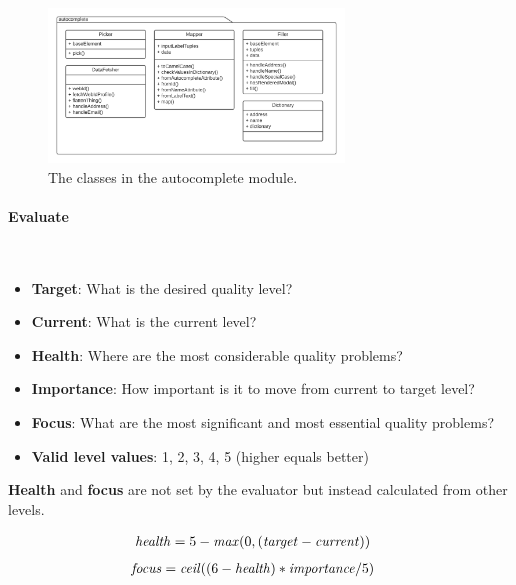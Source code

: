 \begin{figure}[H]
    \centering
    \includegraphics[width=0.7\textwidth]{prototype/graphs/poc-autocomplete-package.png}
    \caption{The classes in the autocomplete module.}
    \label{fig:poc-autocomplete-package}
\end{figure}
\vspace{0.5cm}
\paragraph{Evaluate}\mbox{}\\

\begin{itemize}
    \item \textbf{Target}: What is the desired quality level?
    \item \textbf{Current}: What is the current level?
    \item \textbf{Health}: Where are the most considerable quality problems?
    \item \textbf{Importance}: How important is it to move from current to target level?
    \item \textbf{Focus}: What are the most significant and most essential quality problems?
    \item \textbf{Valid level values}: 1, 2, 3, 4, 5 (higher equals better)
\end{itemize}

\textbf{Health} and \textbf{focus} are not set by the evaluator but instead calculated from other levels.

\begin{align*}
    \text{\textit{health}}&=5 - \text{\textit{max}}(0, (\text{\textit{target}} - \text{\textit{current}}))
\end{align*}
\vspace{-5mm}
\begin{align*}
    \text{\textit{focus}}&= \text{\textit{ceil}}((6 - \text{\textit{health}}) * \text{\textit{importance}}/5)
\end{align*}

